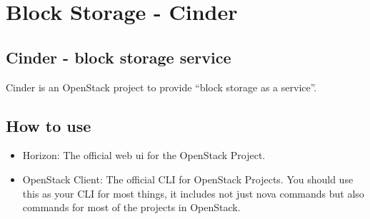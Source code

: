 \documentclass[letterpaper,10pt,english]{sphinxmanual}
\begin{document}
\section{Block Storage - Cinder}
\label{\detokenize{basics/README:block-storage-cinder}}

\subsection{Cinder - block storage service}
\label{\detokenize{basics/README:cinder-block-storage-service}}
Cinder is an OpenStack project to provide “block storage as a service”.


\subsection{How to use}
\label{\detokenize{basics/README:id5}}\begin{itemize}
\item {} 
Horizon: The official web ui for the OpenStack Project.

\item {} 
OpenStack Client: The official CLI for OpenStack Projects. You should use this as your CLI for most things, it includes not just nova commands but also commands for most of the projects in OpenStack.

\end{itemize}
\end{document}

